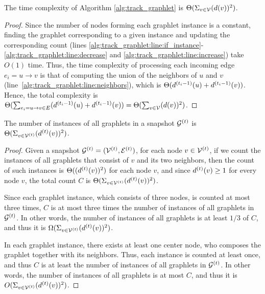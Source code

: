\begin{theorem} \label{thm:time:track} 
The time complexity of Algorithm \ref{alg:track_graphlet} is $\Theta(\Sigma_{v\in\mathcal{V}}(d(v))^2)$.
\end{theorem}
\begin{proof}
Since the number of nodes forming each graphlet instance is a constant, finding the graphlet corresponding to a given instance and updating the corresponding count (lines \ref{alg:track_graphlet:line:if_instance}-\ref{alg:track_graphlet:line:decrease} and \ref{alg:track_graphlet:line:increase}) take $O(1)$ time. Thus, the time complexity of processing each incoming edge $e_i=u\rightarrow v$ is that of computing the union of the neighbors of $u$ and $v$ (line~\ref{alg:track_graphlet:line:neighbors}), which is $\Theta(d^{(t_i-1)}(u)+d^{(t_i-1)}(v))$.
Hence, the total complexity is $\Theta(\sum_{e_i=u \rightarrow v \in E} (d^{(t_i-1)}(u)+d^{(t_i-1)}(v)) = \Theta(\sum_{v\in \mathcal{V}}(d(v))^2)$.
\end{proof}
\begin{lemma} \label{lem:time:optimality} 
The number of instances of all graphlets in a snapshot $\mathcal{G}^{(t)}$ is $\Theta(\Sigma_{v\in\mathcal{V}^{(t)}}(d^{(t)}(v))^2)$.
\end{lemma}
\begin{proof}
Given a snapshot $\mathcal{G}^{(t)}=(\mathcal{V}^{(t)}, \mathcal{E}^{(t)})$, for each node $v\in \mathcal{V}^{(t)}$, if we count the instances of all graphlets that consist of $v$ and its two neighbors, then the count of such instances is $\Theta((d^{(t)}(v))^2)$ for each node $v$, and since $d^{(t)}(v)\geq 1$ for every node $v$, the total count $C$ is $\Theta(\Sigma_{v\in\mathcal{V}^{(t)}}(d^{(t)}(v))^2)$. 

 Since each graphlet instance, which consists of three nodes, is counted at most three times, $C$ is at most three times the number of instances of all graphlets in $\mathcal{G}^{(t)}$.
In other words, the number of instances of all graphlets is at least $1/3$ of $C$, and thus it is $\Omega(\Sigma_{v\in\mathcal{V}^{(t)}}(d^{(t)}(v))^2)$.

 In each graphlet instance, there exists at least one center node, who composes the graphlet together with its neighbors. Thus, each instance is counted at least once, and thus $C$ is at least the number of instances of all graphlets in $\mathcal{G}^{(t)}$.
In other words, the number of instances of all graphlets is at most $C$, and thus it is $O(\Sigma_{v\in\mathcal{V}^{(t)}}(d^{(t)}(v))^2)$.
\end{proof}

